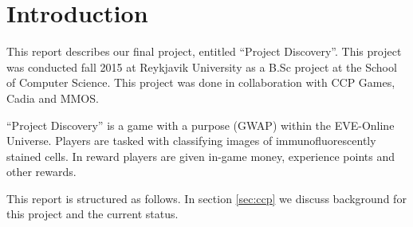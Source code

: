 \section{Introduction}\label{sec:introduction}
This report describes our final project, entitled ``Project Discovery''. This
project was conducted fall 2015 at Reykjavik University as a B.Sc project at
the School of Computer Science. This project was done in collaboration with CCP
Games, Cadia and MMOS.

``Project Discovery'' is a game with a purpose (GWAP) within the EVE-Online
Universe. Players are tasked with classifying images of immunofluorescently
stained cells. In reward players are given in-game money, experience points and
other rewards.

This report is structured as follows. In section \ref{sec:ccp} we discuss background for
this project and the current status.

